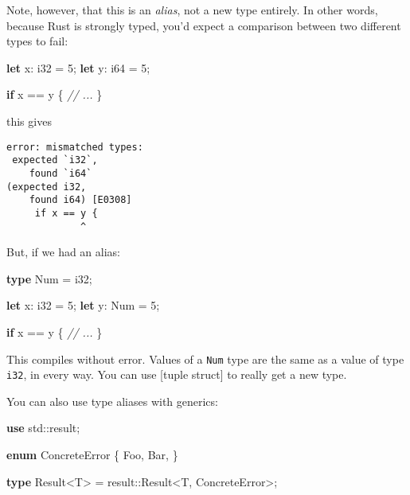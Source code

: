 \documentclass[a4paper,]{book}
\newenvironment{Shaded}{\begin{snugshade}}{\end{snugshade}}
\newcommand{\KeywordTok}[1]{\textcolor[rgb]{0.13,0.29,0.53}{\textbf{{#1}}}}
\newcommand{\DataTypeTok}[1]{\textcolor[rgb]{0.13,0.29,0.53}{{#1}}}
\newcommand{\DecValTok}[1]{\textcolor[rgb]{0.00,0.00,0.81}{{#1}}}
\newcommand{\CommentTok}[1]{\textcolor[rgb]{0.56,0.35,0.01}{\textit{{#1}}}}
\newcommand{\NormalTok}[1]{{#1}}
\begin{document}
Note, however, that this is an \emph{alias}, not a new type entirely. In
other words, because Rust is strongly typed, you'd expect a comparison
between two different types to fail:

\begin{Shaded}
\begin{Highlighting}[]
\KeywordTok{let} \NormalTok{x: }\DataTypeTok{i32} \NormalTok{= }\DecValTok{5}\NormalTok{;}
\KeywordTok{let} \NormalTok{y: }\DataTypeTok{i64} \NormalTok{= }\DecValTok{5}\NormalTok{;}

\KeywordTok{if} \NormalTok{x == y \{}
   \CommentTok{// ...}
\NormalTok{\}}
\end{Highlighting}
\end{Shaded}

this gives

\begin{verbatim}
error: mismatched types:
 expected `i32`,
    found `i64`
(expected i32,
    found i64) [E0308]
     if x == y {
             ^
\end{verbatim}

But, if we had an alias:

\begin{Shaded}
\begin{Highlighting}[]
\KeywordTok{type} \NormalTok{Num = }\DataTypeTok{i32}\NormalTok{;}

\KeywordTok{let} \NormalTok{x: }\DataTypeTok{i32} \NormalTok{= }\DecValTok{5}\NormalTok{;}
\KeywordTok{let} \NormalTok{y: Num = }\DecValTok{5}\NormalTok{;}

\KeywordTok{if} \NormalTok{x == y \{}
   \CommentTok{// ...}
\NormalTok{\}}
\end{Highlighting}
\end{Shaded}

This compiles without error. Values of a \texttt{Num} type are the same
as a value of type \texttt{i32}, in every way. You can use {[}tuple
struct{]} to really get a new type.

You can also use type aliases with generics:

\begin{Shaded}
\begin{Highlighting}[]
\KeywordTok{use} \NormalTok{std::result;}

\KeywordTok{enum} \NormalTok{ConcreteError \{}
    \NormalTok{Foo,}
    \NormalTok{Bar,}
\NormalTok{\}}

\KeywordTok{type} \NormalTok{Result<T> = result::}\DataTypeTok{Result}\NormalTok{<T, ConcreteError>;}
\end{Highlighting}
\end{Shaded}
\end{document}
